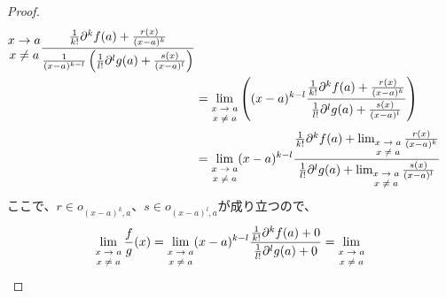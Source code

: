 \documentclass[dvipdfmx]{jsarticle}
\begin{document}
\begin{proof}
\begin{align*}
{\begin{matrix}
x \rightarrow a \\
x \neq a \\
\end{matrix}}\frac{\frac{1}{k!}\partial^{k}f(a) + \frac{r(x)}{(x - a)^{k}}}{\frac{1}{(x - a)^{k - l}}\left( \frac{1}{l!}\partial^{l}g(a) + \frac{s(x)}{(x - a)^{l}} \right)}\\
&= \lim_{\scriptsize \begin{matrix}
x \rightarrow a \\
x \neq a \\
\end{matrix}}\left( (x - a)^{k - l}\frac{\frac{1}{k!}\partial^{k}f(a) + \frac{r(x)}{(x - a)^{k}}}{\frac{1}{l!}\partial^{l}g(a) + \frac{s(x)}{(x - a)^{l}}} \right)\\
&= \lim_{\scriptsize \begin{matrix}
x \rightarrow a \\
x \neq a \\
\end{matrix}}(x - a)^{k - l}\frac{\frac{1}{k!}\partial^{k}f(a) + \lim_{\scriptsize \begin{matrix}
x \rightarrow a \\
x \neq a \\
\end{matrix}}\frac{r(x)}{(x - a)^{k}}}{\frac{1}{l!}\partial^{l}g(a) + \lim_{\scriptsize \begin{matrix}
x \rightarrow a \\
x \neq a \\
\end{matrix}}\frac{s(x)}{(x - a)^{l}}}
\end{align*}
ここで、$r \in o_{(x - a)^{k},a}$、$s \in o_{(x - a)^{l},a}$が成り立つので、
\begin{align*}
\lim_{\scriptsize \begin{matrix}
x \rightarrow a \\
x \neq a \\
\end{matrix}}{\frac{f}{g}(x)} = \lim_{\scriptsize \begin{matrix}
x \rightarrow a \\
x \neq a \\
\end{matrix}}(x - a)^{k - l}\frac{\frac{1}{k!}\partial^{k}f(a) + 0}{\frac{1}{l!}\partial^{l}g(a) + 0} = \lim_{\scriptsize \begin{matrix}
x \rightarrow a \\
x \neq a \\

\end{matrix}}
\end{align*}
\end{proof}
\end{document}
